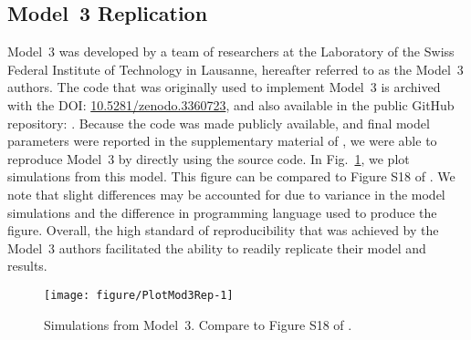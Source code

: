 \subsection{Model~3 Replication}

Model~3 was developed by a team of researchers at the Laboratory of the Swiss Federal Institute of Technology in Lausanne, hereafter referred to as the Model~3 authors.
The code that was originally used to implement Model~3 is archived with the DOI: \url{10.5281/zenodo.3360723}, and also available in the public GitHub repository: .
Because the code was made publicly available, and final model parameters were reported in the supplementary material of \cite{lee20}, we were able to reproduce Model~3 by directly using the source code.
In Fig.~\ref{fig:mod3rep}, we plot simulations from this model.
This figure can be compared to Figure S18 of \cite{lee20}.
We note that slight differences may be accounted for due to variance in the model simulations and the difference in programming language used to produce the figure.
Overall, the high standard of reproducibility that was achieved by the Model~3 authors facilitated the ability to readily replicate their model and results.



\begin{figure}[!h]
\begin{knitrout}
\color{fgcolor}

{\centering \texttt{[image: figure/PlotMod3Rep-1]} 

}


\end{knitrout}
\caption{\label{fig:mod3rep}
Simulations from Model~3.
Compare to Figure S18 of \cite{lee20}.
}
\end{figure}



